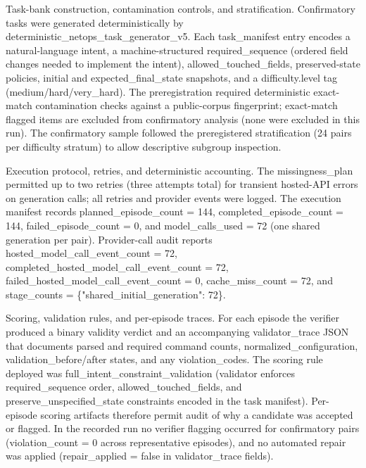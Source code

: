\documentclass[conference]{IEEEtran}
\begin{document}
Task-bank construction, contamination controls, and stratification. Confirmatory tasks were generated deterministically by deterministic\_netops\_task\_generator\_v5. Each task\_manifest entry encodes a natural-language intent, a machine-structured required\_sequence (ordered field changes needed to implement the intent), allowed\_touched\_fields, preserved-state policies, initial and expected\_final\_state snapshots, and a difficulty.level tag (medium/hard/very\_hard). The preregistration required deterministic exact-match contamination checks against a public-corpus fingerprint; exact-match flagged items are excluded from confirmatory analysis (none were excluded in this run). The confirmatory sample followed the preregistered stratification (24 pairs per difficulty stratum) to allow descriptive subgroup inspection.

Execution protocol, retries, and deterministic accounting. The missingness\_plan permitted up to two retries (three attempts total) for transient hosted-API errors on generation calls; all retries and provider events were logged. The execution manifest records planned\_episode\_count = 144, completed\_episode\_count = 144, failed\_episode\_count = 0, and model\_calls\_used = 72 (one shared generation per pair). Provider-call audit reports hosted\_model\_call\_event\_count = 72, completed\_hosted\_model\_call\_event\_count = 72, failed\_hosted\_model\_call\_event\_count = 0, cache\_miss\_count = 72, and stage\_counts = \{"shared\_initial\_generation": 72\}.

Scoring, validation rules, and per-episode traces. For each episode the verifier produced a binary validity verdict and an accompanying validator\_trace JSON that documents parsed and required command counts, normalized\_configuration, validation\_before/after states, and any violation\_codes. The scoring rule deployed was full\_intent\_constraint\_validation (validator enforces required\_sequence order, allowed\_touched\_fields, and preserve\_unspecified\_state constraints encoded in the task manifest). Per-episode scoring artifacts therefore permit audit of why a candidate was accepted or flagged. In the recorded run no verifier flagging occurred for confirmatory pairs (violation\_count = 0 across representative episodes), and no automated repair was applied (repair\_applied = false in validator\_trace fields).
\end{document}
